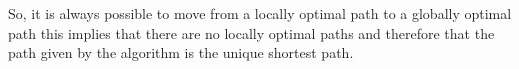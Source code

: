 So, it is always possible to move from a locally optimal path to a globally optimal path this implies that there are no locally optimal paths and therefore that the path given by the algorithm is the unique shortest path.








%
%
%
%
%
%
%
